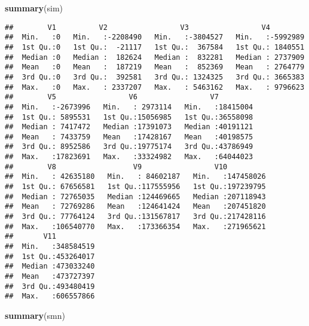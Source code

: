 \documentclass[]{article}
\newenvironment{Shaded}{\begin{snugshade}}{\end{snugshade}}
\newcommand{\KeywordTok}[1]{\textcolor[rgb]{0.13,0.29,0.53}{\textbf{#1}}}
\newcommand{\NormalTok}[1]{#1}
\begin{document}
\begin{Shaded}
\begin{Highlighting}[]
\KeywordTok{summary}\NormalTok{(sim)}
\end{Highlighting}
\end{Shaded}

\begin{verbatim}
##        V1          V2                 V3                 V4          
##  Min.   :0   Min.   :-2208490   Min.   :-3804527   Min.   :-5992989  
##  1st Qu.:0   1st Qu.:  -21117   1st Qu.:  367584   1st Qu.: 1840551  
##  Median :0   Median :  182624   Median :  832281   Median : 2737909  
##  Mean   :0   Mean   :  187219   Mean   :  852369   Mean   : 2764779  
##  3rd Qu.:0   3rd Qu.:  392581   3rd Qu.: 1324325   3rd Qu.: 3665383  
##  Max.   :0   Max.   : 2337207   Max.   : 5463162   Max.   : 9796623  
##        V5                 V6                 V7          
##  Min.   :-2673996   Min.   : 2973114   Min.   :18415004  
##  1st Qu.: 5895531   1st Qu.:15056985   1st Qu.:36558098  
##  Median : 7417472   Median :17391073   Median :40191121  
##  Mean   : 7433759   Mean   :17428167   Mean   :40198575  
##  3rd Qu.: 8952586   3rd Qu.:19775174   3rd Qu.:43786949  
##  Max.   :17823691   Max.   :33324982   Max.   :64044023  
##        V8                  V9                 V10           
##  Min.   : 42635180   Min.   : 84602187   Min.   :147458026  
##  1st Qu.: 67656581   1st Qu.:117555956   1st Qu.:197239795  
##  Median : 72765035   Median :124469665   Median :207118943  
##  Mean   : 72769286   Mean   :124641424   Mean   :207451820  
##  3rd Qu.: 77764124   3rd Qu.:131567817   3rd Qu.:217428116  
##  Max.   :106540770   Max.   :173366354   Max.   :271965621  
##       V11           
##  Min.   :348584519  
##  1st Qu.:453264017  
##  Median :473033240  
##  Mean   :473727397  
##  3rd Qu.:493480419  
##  Max.   :606557866
\end{verbatim}

\begin{Shaded}
\begin{Highlighting}[]
\KeywordTok{summary}\NormalTok{(smn)}
\end{Highlighting}
\end{Shaded}
\end{document}
